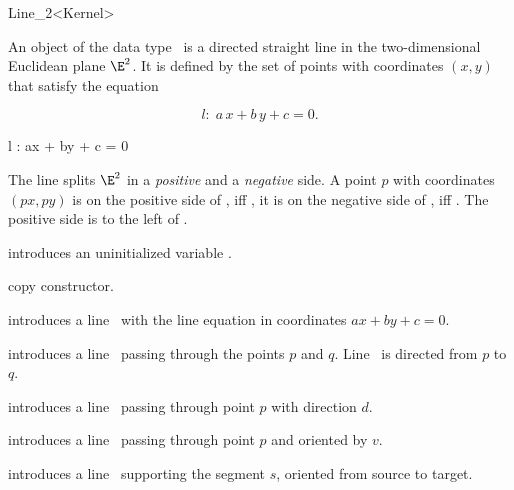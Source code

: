 \begin{ccRefClass} {Line_2<Kernel>}

\ccDefinition
An object  of the data type \ccRefName\ is a directed
straight line in the two-dimensional Euclidean plane $\E^2$. It is
defined by the set of points with  coordinates $(x,y)$ 
that satisfy the equation 
\begin{ccTexOnly}
\[ l:\; a\, x +b\, y +c = 0. \]
\end{ccTexOnly}
\begin{ccHtmlOnly}
 l : ax + by + c = 0 
\end{ccHtmlOnly}
 
The line splits $\E^2$ in a {\em positive} and a {\em negative}
side. A point $p$ with  coordinates 
$(px, py)$ is on the positive side of , iff
, it is
on the negative side of , iff 
.
The positive side is to the left of .

\ccCreation
{}

\ccHidden {}
             {introduces an uninitialized variable \ccVar.}

\ccHidden {}
            {copy constructor.}

            {introduces a line \ccVar\ with the line equation in 
              coordinates $ax +by +c = 0$.}

            {introduces a line \ccVar\ passing through the points $p$ and $q$. 
             Line \ccVar\ is directed from $p$ to $q$.}

            {introduces a line \ccVar\ passing through point $p$ with 
             direction $d$.}

            {introduces a line \ccVar\ passing through point $p$ and
             oriented by $v$.}

            {introduces a line \ccVar\ supporting the segment $s$,
            oriented from source to target.}


\end{ccRefClass}
